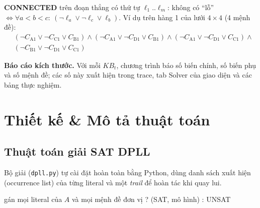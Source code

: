 \documentclass{article}
\newcommand{\code}[1]{\texttt{#1}}
\newcommand{\KB}{\mathit{KB}}
\begin{document}
\textbf{CONNECTED} trên đoạn thẳng có thứ tự $\ell_1..\ell_m$: không có ``lỗ'' $\iff \forall a<b<c:\ (\neg\ell_a \lor \neg\ell_c \lor \ell_b)$. Ví dụ trên hàng 1 của lưới $4\times4$ (4 mệnh đề):
\begin{align*}
& (\neg C_{\mathrm{A1}} \lor \neg C_{\mathrm{C1}} \lor C_{\mathrm{B1}}) \land (\neg C_{\mathrm{A1}} \lor \neg C_{\mathrm{D1}} \lor C_{\mathrm{B1}}) \land (\neg C_{\mathrm{A1}} \lor \neg C_{\mathrm{D1}} \lor C_{\mathrm{C1}}) \land \\
& (\neg C_{\mathrm{B1}} \lor \neg C_{\mathrm{D1}} \lor C_{\mathrm{C1}})
\end{align*}

\textbf{Báo cáo kích thước.} Với mỗi $\KB_t$, chương trình báo số biến chính, số biến phụ và số mệnh đề; các số này xuất hiện trong trace, tab Solver của giao diện và các bảng thực nghiệm.

\section{Thiết kế \& Mô tả thuật toán}

\subsection{Thuật toán giải SAT DPLL}
Bộ giải (\code{dpll.py}) tự cài đặt hoàn toàn bằng Python, dùng danh sách xuất hiện (occurrence list) của từng literal và một \textit{trail} để hoàn tác khi quay lui.

\begin{algorithm}[H]
\caption{DPLL với assumption}
gán mọi literal của $A$ và mọi mệnh đề đơn vị
\Return \Search{} ? (SAT, mô hình) : UNSAT\;
\BlankLine
{}
\end{algorithm}
\end{document}
